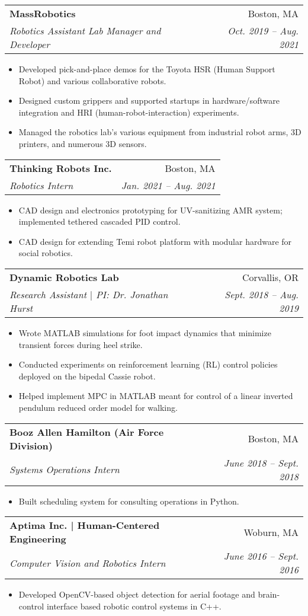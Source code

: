 \documentclass[letterpaper,11pt]{article}
\makeatletter
\newcommand{\resumeItem}[1]{
  \item\small{
    {#1 \vspace{-2pt}}
  }
}
\newcommand{\resumeSubheading}[4]{
  \vspace{-2pt}\item
    \begin{tabular*}{0.97\textwidth}[t]{l@{\extracolsep{\fill}}r}
      \textbf{#1} & #2 \\
      \textit{\small#3} & \textit{\small #4} \\
    \end{tabular*}\vspace{-7pt}
}
\newcommand{\resumeSubSubheading}[2]{
    \item
    \begin{tabular*}{0.97\textwidth}{l@{\extracolsep{\fill}}r}
      \textit{\small#1} & \textit{\small #2} \\
    \end{tabular*}\vspace{-7pt}
}
\newcommand{\resumeSubHeadingListEnd}{\end{itemize}}
\newcommand{\resumeItemListStart}{\begin{itemize}}
\newcommand{\resumeItemListEnd}{\end{itemize}\vspace{-5pt}}
\makeatother
\begin{document}
    \resumeSubheading
      {MassRobotics}{Boston, MA}
      {Robotics Assistant Lab Manager and Developer}{Oct. 2019 -- Aug. 2021}
      \resumeItemListStart
        \resumeItem{Developed pick-and-place demos for the Toyota HSR (Human Support Robot) and various collaborative robots.}
        \resumeItem{Designed custom grippers and supported startups in hardware/software integration and HRI (human-robot-interaction) experiments.}
        \resumeItem{Managed the robotics lab's various equipment from industrial robot arms, 3D printers, and numerous 3D sensors.}
      \resumeItemListEnd

    \resumeSubheading
      {Thinking Robots Inc.}{Boston, MA}
      {Robotics Intern}{Jan. 2021 -- Aug. 2021}
      \resumeItemListStart
        \resumeItem{CAD design and electronics prototyping for UV-sanitizing AMR system; implemented tethered cascaded PID control.}
        \resumeItem{CAD design for extending Temi robot platform with modular hardware for social robotics.}
      \resumeItemListEnd

    \resumeSubheading
      {Dynamic Robotics Lab}{Corvallis, OR}
      {Research Assistant $|$ PI: Dr. Jonathan Hurst}{Sept. 2018 -- Aug. 2019}
      \resumeItemListStart
        \resumeItem{Wrote MATLAB simulations for foot impact dynamics that minimize transient forces during heel strike.}
        \resumeItem{Conducted experiments on reinforcement learning (RL) control policies deployed on the bipedal Cassie robot.}
        \resumeItem{Helped implement MPC in MATLAB meant for control of a linear inverted pendulum reduced order model for walking.}
      \resumeItemListEnd

    \resumeSubheading
      {Booz Allen Hamilton (Air Force Division)}{Boston, MA}
      {Systems Operations Intern}{June 2018 -- Sept. 2018}
      \resumeItemListStart
        \resumeItem{Built scheduling system for consulting operations in Python.}
      \resumeItemListEnd

    \resumeSubheading
      {Aptima Inc. | Human-Centered Engineering}{Woburn, MA}
      {Computer Vision and Robotics Intern}{June 2016 -- Sept. 2016}
      \resumeItemListStart
        \resumeItem{Developed OpenCV-based object detection for aerial footage and brain-control interface based robotic control systems in C++.}
      \resumeItemListEnd


      
\end{document}
